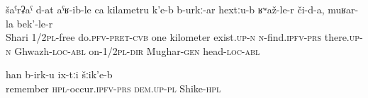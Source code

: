 %
\begin{exe}
	\ex	\label{ex:They sent us to Shari it is probably one kilometer}
	\gll	šaˁrʡaˁ	d-at	aˁʁ-ib-le	ca	kilametru	k'e-b	b-urkː-ar	hextːu-b		ʁʷaž-le-r	či-d-a,	muʁar-la	bek'-le-r   \\
		Shari	1/2\textsc{pl}-free	do.\textsc{pfv-pret-cvb}		one	kilometer	exist.\textsc{up-n}	\textsc{n}-find.\textsc{ipfv-prs}	there.\textsc{up-n}	Ghwazh-\textsc{loc-abl}	on-1/2\textsc{pl-dir} Mughar-\textsc{gen}	head-\textsc{loc-abl}\\
	\glt	{}

	\ex	\label{ex:As I remember they were in Shike}
	\gll	han b-irk-u	ix-tːi	šːik'e-b  \\
		remember \textsc{hpl}-occur.\textsc{ipfv-prs}	\textsc{dem.up}-\textsc{pl}	Shike-\textsc{hpl}\\
	\glt	{}
\end{exe}
